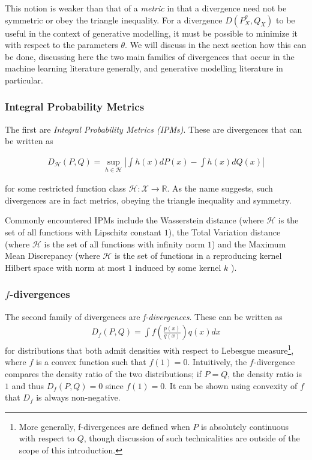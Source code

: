 This notion is weaker than that of a \emph{metric} in that a divergence need not be symmetric or obey the triangle inequality.
For a divergence $D(P^\theta_X, Q_X)$ to be useful in the context of generative modelling, it must be possible to minimize it with respect to the parameters $\theta$. 
We will discuss in the next section how this can be done, discussing here the two main families 
of divergences that occur in the machine learning literature generally, and generative modelling literature in particular. 

\subsubsection{Integral Probability Metrics}

The first are \emph{Integral Probability Metrics (IPMs)}. 
These are divergences that can be written as

\begin{align*}
D_{\mathcal{H}}(P, Q) = \sup_{h\in\mathcal{H}} \left| \int h(x) dP(x) - \int h(x) dQ(x) \right|
\end{align*}

for some restricted function class $\mathcal{H}: \mathcal{X} \to \mathbb{R}$. 
As the name suggests, such divergences are in fact metrics, obeying the triangle inequality and symmetry.

Commonly encountered IPMs include the Wasserstein distance (where $\mathcal{H}$ is the set of all functions with Lipschitz constant $1$), the Total Variation distance (where $\mathcal{H}$ is the set of all functions with infinity norm $1$) and the Maximum Mean Discrepancy (where $\mathcal{H}$ is the set of functions in a reproducing kernel Hilbert space with norm at most $1$ induced by some kernel $k$ \cite{gretton}).

\subsubsection{$f$-divergences}

The second family of divergences are \emph{f-divergences}. 
These can be written as
\begin{align*}
D_f(P, Q) = \int f\left(\frac{p(x)}{q(x)}\right) q(x) dx
\end{align*}
for distributions that both admit densities with respect to Lebesgue measure\footnote{More generally, f-divergences are defined when $P$ is absolutely continuous with respect to $Q$, though discussion of such technicalities are outside of the scope of this introduction.}, where $f$ is a convex function such that $f(1)=0$. 
Intuitively, the $f$-divergence compares the density ratio of the two distributions; if $P=Q$, the density ratio is $1$ and thus $D_f(P,Q) = 0$ since $f(1)=0$. 
It can be shown using convexity of $f$ that $D_f$ is always non-negative.

